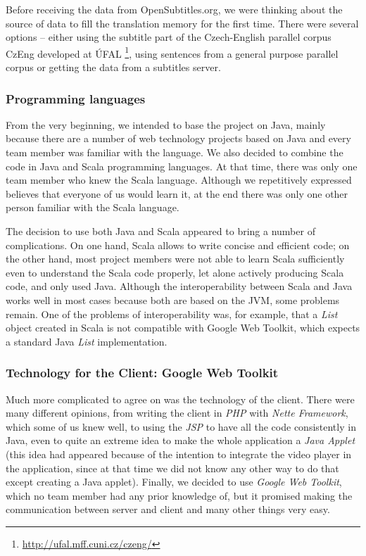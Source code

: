 Before receiving the data from OpenSubtitles.org, we were thinking about the source of data to fill the translation memory for the first time. There were several options -- either using the subtitle part of the Czech-English parallel corpus CzEng developed at ÚFAL \footnote{\url{http://ufal.mff.cuni.cz/czeng/}}, using sentences from a general purpose parallel corpus or getting the data from a subtitles server.

\subsubsection{Programming languages}

From the very beginning, we intended to base the project on Java, mainly because there are a number of web technology projects based on Java and
 every team member was familiar with the language. 
We also decided to combine the code in Java and Scala programming 
languages. At that time, there was 
only one team member who knew the Scala language. Although we 
repetitively expressed believes that everyone of us would learn it, at 
the end there was only one other person familiar with the Scala language.

The decision to use both Java and Scala appeared to bring a number of 
complications. On one hand, Scala allows to write concise and efficient 
code; on the other hand, most project members were not able to learn 
Scala sufficiently even to understand the Scala code properly, let alone 
actively producing Scala code, and only used Java.
Although the interoperability between Scala and Java works well in most 
cases because both are based on the JVM, some problems remain. One of the 
problems of interoperability was, for example, that a \emph{List} object 
created in Scala is not compatible with Google Web Toolkit, which expects 
a standard Java \emph{List} implementation.

\subsubsection{Technology for the Client: Google Web Toolkit}
\label{subsubsec:implementation:gwt}

Much more complicated to agree on was the technology of the client. There were many different opinions, from writing the client in {\it PHP} with {\it Nette Framework}, which some of us knew well, to using the {\it JSP} to have all the code consistently in Java, even to quite an extreme idea to make the whole application a {\it Java Applet} (this idea had appeared because of the intention to integrate the video player in the application, since at that time we did not know any other way to do that except creating a Java applet). Finally, we decided to use {\it Google Web Toolkit}, which no team member had any prior knowledge of, but it promised making the communication between server and client and many other things very easy. 

